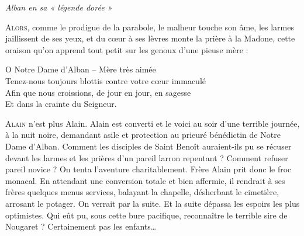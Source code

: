 
\begin{center}
    {\Large\itshape Alban en sa « légende dorée »}
\end{center}

\medskip

\lettrine[lines=2]{A}{lors}, comme le prodigue de la parabole, le malheur touche son âme,
les larmes jaillissent de ses yeux, et du cœur à ses lèvres monte la prière
à la Madone, cette oraison qu’on apprend tout petit sur les genoux d’une
pieuse mère :

\begin{center}
    O Notre Dame d’Alban -- Mère très aimée\\
    Tenez-nous toujours blottis contre votre cœur immaculé\\
    Afin que nous croissions, de jour en jour, en sagesse\\
    Et dans la crainte du Seigneur.
\end{center}

\medskip

\lettrine[lines=2]{A}{lain} n’est plus Alain. Alain est converti et le voici au soir d’une
terrible journée, à la nuit noire, demandant asile et protection au prieuré
bénédictin de Notre Dame d’Alban. Comment les disciples de Saint Benoît
auraient-ils pu se récuser devant les larmes et les prières d’un pareil
larron repentant ? Comment refuser pareil novice ? On tenta l’aventure
charitablement. Frère Alain prit donc le froc monacal. En attendant une
conversion totale et bien affermie, il rendrait à ses frères quelques menus
services, balayant la chapelle, désherbant le cimetière, arrosant le potager.
On verrait par la suite. Et la suite dépassa les espoirs les plus optimistes.
Qui eût pu, sous cette bure pacifique, reconnaître le terrible sire de
Nougaret ? Certainement pas les enfants…
